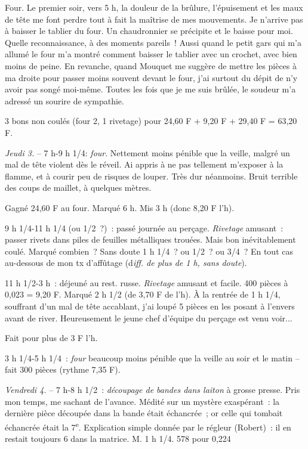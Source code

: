 \documentclass[french,twoside]{book} %
\begin{document}
Four. Le premier soir, vers 5 h, la douleur de la brûlure, l'épuisement et les maux de tête me font perdre tout à fait la maîtrise de mes mouvements. Je n'arrive pas à baisser le tablier du four. Un chaudronnier se précipite et le baisse pour moi. Quelle reconnaissance, à des moments pareils ! Aussi quand le petit gars qui m'a allumé le four m'a montré comment baisser le tablier avec un crochet, avec bien moins de peine. En revanche, quand Mouquet me suggère de mettre les pièces à ma droite pour passer moins souvent devant le four, j'ai surtout du dépit de n'y avoir pas songé moi-même. Toutes les fois que je me suis brûlée, le soudeur m'a adressé un sourire de sympathie.\par
3 bons non coulés (four 2, 1 rivetage) pour 24,60 F + 9,20 F + 29,40 F = 63,20 F.\par
{\itshape Jeudi 3.} – 7 h-9 h 1/4: {\itshape four}. Nettement moins pénible que la veille, malgré un mal de tête violent dès le réveil. Ai appris à ne pas tellement m'exposer à la flamme, et à courir peu de risques de louper. Très dur néanmoins. Bruit terrible des coups de maillet, à quelques mètres.\par
Gagné 24,60 F au four. Marqué 6 h. Mis 3 h (donc 8,20 F l'h).\par
9 h 1/4-11 h 1/4 (ou 1/2 ?) : passé journée au perçage. {\itshape Rivetage} amusant : passer rivets dans piles de feuilles métalliques trouées. Mais bon inévitablement coulé. Marqué combien ? Sans doute 1 h 1/4 ? ou 1/2 ? ou 3/4 ? En tout cas au-dessous de mon tx d'affûtage (d{\itshape iff. de plus de 1 h, sans doute}).\par
11 h 1/2-3 h : déjeuné au rest. russe. {\itshape Rivetage} amusant et facile. 400 pièces à 0,023 = 9,20 F. Marqué 2 h 1/2 (de 3,70 F de l'h). À la rentrée de 1 h 1/4, souffrant d'un mal de tête accablant, j'ai loupé 5 pièces en les posant à l'envers avant de river. Heureusement le jeune chef d'équipe du perçage est venu voir...\par
Fait pour plus de 3 F l'h.\par
3 h 1/4-5 h 1/4 : {\itshape four} beaucoup moins pénible que la veille au soir et le matin – fait 300 pièces (rythme 7,35 F).\par
{\itshape Vendredi 4.} – 7 h-8 h 1/2 : {\itshape découpage de bandes dans laiton} à grosse presse. Pris mon temps, me sachant de l'avance. Médité sur un mystère exaspérant : la dernière pièce découpée dans la bande était échancrée ; or celle qui tombait échancrée était la 7\textsuperscript{e}. Explication simple donnée par le régleur (Robert) : il en restait toujours 6 dans la matrice. M. 1 h 1/4. 578 pour 0,224\par
\end{document}
